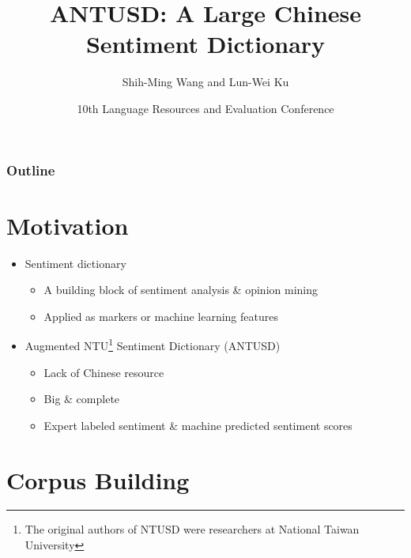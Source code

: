 \documentclass[compress]{beamer}
\title{ANTUSD: A Large Chinese Sentiment Dictionary }
\author{Shih-Ming Wang and Lun-Wei Ku}
\date[LREC 2016]{10th Language Resources and Evaluation Conference}
\begin{document}
\beamertemplatenavigationsymbolsempty

\begin{frame}[plain]
    \titlepage
\end{frame}

\begin{frame}
    \frametitle{Outline}
    \tableofcontents %
\end{frame}
\section{Motivation}
    \begin{frame}{\secname}
        \begin{itemize}
            \item Sentiment dictionary
            \begin{itemize}
                \item A building block of sentiment analysis \& opinion mining
                \item Applied as markers or machine learning features
            \end{itemize}
            \item Augmented NTU\footnote{The original authors of NTUSD were researchers at National Taiwan University} Sentiment Dictionary (ANTUSD)
            \begin{itemize}
                \item Lack of Chinese resource
                \item Big \& complete
                \item Expert labeled sentiment \& machine predicted sentiment scores
            \end{itemize}
        \end{itemize}
    \end{frame}

\section{Corpus Building}
\end{document}
